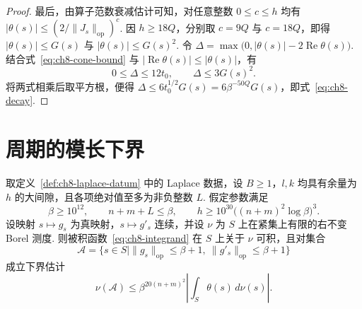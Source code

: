 \begin{proof}
最后，由算子范数衰减估计可知，对任意整数 $0\le c\le h$ 均有 $|\theta(s)|\le (2/\|J_s\|_{\mathrm{op}})^c$. 因 $h\ge18Q$，分别取 $c=9Q$ 与 $c=18Q$，即得 $|\theta(s)|\le G(s)$ 与 $|\theta(s)|\le G(s)^2$. 令 $\Delta=\max\bigl(0,|\theta(s)|-2\operatorname{Re}\theta(s)\bigr)$. 结合式~\eqref{eq:ch8-cone-bound} 与 $|\operatorname{Re}\theta(s)|\le|\theta(s)|$，有
\[
 0\le\Delta\le12t_0,\qquad \Delta\le3G(s)^2.
\]
将两式相乘后取平方根，便得 $\Delta\le6t_0^{1/2}G(s)=6\beta^{-50Q}G(s)$，即式~\eqref{eq:ch8-decay}.
\end{proof}

\section{周期的模长下界}
\label{sec:ch8-laplace-theorem}

\begin{theorem}
\label{thm:ch8-laplace}
\emitthmsource
取定义~\ref{def:ch8-laplace-datum} 中的 Laplace 数据，设 $B\ge1$，$l,k$ 均具有余量为 $h$ 的大间隙，且各项绝对值至多为非负整数 $L$. 假定参数满足
\[
 \beta\ge10^{12},\qquad n+m+L\le\beta,\qquad
 h\ge10^{30}\bigl((n+m)^2\log\beta\bigr)^3.
\]
设映射 $s\mapsto g_s$ 为真映射，$s\mapsto g'_s$ 连续，并设 $\nu$ 为 $S$ 上在紧集上有限的右不变 Borel 测度. 则被积函数~\eqref{eq:ch8-integrand} 在 $S$ 上关于 $\nu$ 可积，且对集合
\[
 \mathcal A=\bigl\{s\in S\mid \|g_s\|_{\mathrm{op}}\le\beta+1,\
                           \|g'_s\|_{\mathrm{op}}\le\beta+1\bigr\}
\]
成立下界估计
\begin{equation}
\label{eq:ch8-laplace-lower}
  \nu(\mathcal A)\le
  \beta^{20(n+m)^2}\left|\int_S\theta(s)\,d\nu(s)\right|.
\end{equation}
\end{theorem}

